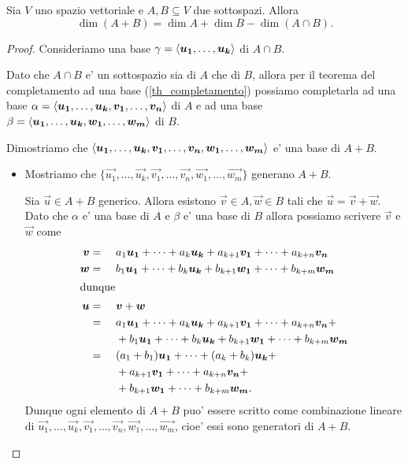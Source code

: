 \begin{theorem}
     \label{th_grassman}
    Sia $V$ uno spazio vettoriale e $A, B \subseteq V$ due sottospazi. Allora \begin{equation}
        \dim(A + B) = \dim A + \dim B - \dim(A \cap B).
    \end{equation}
\end{theorem}
\begin{proof}
    Consideriamo una base $\gamma = \basis{\vec{u_1}, \dots, \vec{u_k}}$ di $A \cap B$.

    Dato che $A \cap B$ e' un sottospazio sia di $A$ che di $B$, allora per il teorema del completamento ad una base (\ref{th_completamento}) possiamo completarla ad una base $\alpha = \basis{\vec{u_1}, \dots, \vec{u_k}, \vec{v_1}, \dots, \vec{v_n}}$ di $A$ e ad una base $\beta = \basis{\vec{u_1}, \dots, \vec{u_k}, \vec{w_1}, \dots, \vec{w_m}}$ di $B$.

    Dimostriamo che $\basis{\vec{u_1}, \dots, \vec{u_k}, \vec{v_1}, \dots, \vec{v_n}, \vec{w_1}, \dots, \vec{w_m}}$ e' una base di $A + B$.

    \begin{itemize}
        \item Mostriamo che $\{\vec{u_1}, \dots, \vec{u_k}, \vec{v_1}, \dots, \vec{v_n}, \vec{w_1}, \dots, \vec{w_m}\}$ generano $A + B$.
        
        Sia $\vec u \in A + B$ generico. Allora esistono $\vec v \in A, \vec w \in B$ tali che $\vec{u} = \vec{v} + \vec{w}$. Dato che $\alpha$ e' una base di $A$ e $\beta$ e' una base di $B$ allora possiamo scrivere $\vec v$ e $\vec w$ come \begin{alignat*}{2}
            \vec{v} &=\ && a_1\vec{u_1} + \dots + a_k\vec{u_k} + a_{k+1}\vec{v_1} + \dots + a_{k+n}\vec{v_n} \\
            \vec{w} &=\ && b_1\vec{u_1} + \dots + b_k\vec{u_k} + b_{k+1}\vec{w_1} + \dots + b_{k+m}\vec{w_m} \\
            \intertext{dunque}
            \vec{u} &=\ && \vec{v} + \vec{w}\\
                &=\ && a_1\vec{u_1} + \dots + a_k\vec{u_k} + a_{k+1}\vec{v_1} + \dots + a_{k+n}\vec{v_n} + \\
                & && + b_1\vec{u_1} + \dots + b_k\vec{u_k} + b_{k+1}\vec{w_1} + \dots + b_{k+m}\vec{w_m} \\
                &=\ && (a_1 + b_1)\vec{u_1} + \dots + (a_k + b_k)\vec{u_k} + \\
                & && + a_{k+1}\vec{v_1} + \dots + a_{k+n}\vec{v_n} + \\
                & && + b_{k+1}\vec{w_1} + \dots + b_{k+m}\vec{w_m}.
        \end{alignat*}
        Dunque ogni elemento di $A + B$ puo' essere scritto come combinazione lineare di $\vec{u_1}, \dots, \vec{u_k}, \vec{v_1}, \dots, \vec{v_n}, \vec{w_1}, \dots, \vec{w_m}$, cioe' essi sono generatori di $A + B$.


\end{itemize}
\end{proof}

